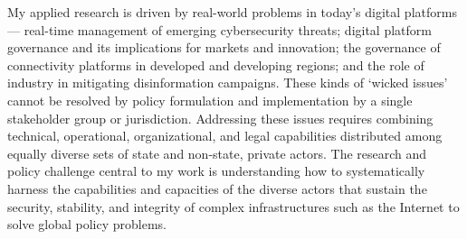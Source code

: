 \documentclass[11pt]{letter}
\begin{document}
\begin{letter}
My applied research is driven by real-world problems in today's digital platforms---%
  real-time management of emerging cybersecurity threats; 
  digital platform governance and its implications for markets and innovation; 
  the governance of connectivity platforms in developed and developing regions; and 
  the role of industry in mitigating disinformation campaigns.
%
These kinds of `wicked issues' cannot be resolved by policy formulation and implementation by a single stakeholder group or jurisdiction.
%
Addressing these issues requires combining technical, operational, organizational, and legal capabilities distributed among equally diverse sets of state and non-state, private actors.
%
The research and policy challenge central to my work is understanding how to systematically harness the capabilities and capacities of the diverse actors that sustain the security, stability, and integrity of complex infrastructures such as the Internet to solve global policy problems.
%
%
%


\end{letter}
\end{document}

